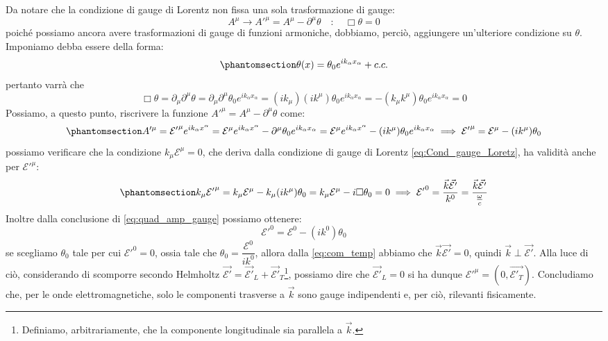 Da notare che la condizione di gauge di Lorentz non fissa una sola trasformazione di gauge:
\begin{equation*}
    A^\mu \rightarrow A'^\mu=A^\mu-\partial^\mu \theta \quad:\quad \Box \theta=0
\end{equation*}
poiché possiamo ancora avere trasformazioni di gauge di funzioni armoniche, dobbiamo, perciò, aggiungere un'ulteriore condizione su $\theta$. Imponiamo debba essere della forma:
\begin{equation}\phantomsection\label{eq:teta_piana}
    \theta(x)=\theta_0 e^{ik_\alpha x_\alpha}+c.c.
\end{equation}
pertanto varrà che 
\begin{equation*}
    \Box \theta=\partial_\mu\partial^\mu \theta=\partial_\mu\partial^\mu \theta_0 e^{ik_\alpha x_\alpha}=(ik_\mu)(ik^\mu)\theta_0 e^{ik_\alpha x_\alpha}=-(k_\mu k^\mu)\theta_0 e^{ik_\alpha x_\alpha}=0
\end{equation*}
Possiamo, a questo punto, riscrivere la funzione $A'^\mu=A^\mu-\partial^\mu\theta$ come:
\begin{equation}\phantomsection\label{eq:quad_amp_gauge}
    A'^\mu=\mathcal{E'}^\mu e^{ik_\alpha x^\alpha}=\mathcal{E}^\mu e^{ik_\alpha x^\alpha}-\partial^\mu \theta_0 e^{ik_\alpha x_\alpha}=\mathcal{E}^\mu e^{ik_\alpha x^\alpha}-(ik^\mu) \theta_0 e^{ik_\alpha x_\alpha}\implies\mathcal{E'}^\mu=\mathcal{E}^\mu -(ik^\mu) \theta_0 
\end{equation}
possiamo verificare che la condizione $k_\mu\mathcal{E}^\mu=0$, che deriva dalla condizione di gauge di Lorentz \eqref{eq:Cond_gauge_Loretz}, ha validità anche per $\mathcal{E'}^\mu$:
\begin{equation}\phantomsection\label{eq:com_temp}
       k_\mu\mathcal{E'}^\mu= k_\mu\mathcal{E}^\mu-k_\mu(ik^\mu) \theta_0 =k_\mu\mathcal{E}^\mu-i\Box \theta_0 =0 \implies\mathcal{E'}^0=\dfrac{\Vec{k}\Vec{\mathcal{E'}}}{k^0}=\dfrac{\Vec{k}\Vec{\mathcal{E'}}}{\frac{\omega}{c  }}
\end{equation}
Inoltre dalla conclusione di \eqref{eq:quad_amp_gauge} possiamo ottenere:
\begin{equation}
  \mathcal{E'}^0=\mathcal{E}^0 -(ik^0) \theta_0 
\end{equation}
se scegliamo $ \theta_0 $ tale per cui $\mathcal{E'}^0=0$, ossia tale che $\theta_0=\dfrac{\mathcal{E}^0}{ik^0}$, allora dalla \eqref{eq:com_temp} abbiamo che $\Vec{k}\Vec{\mathcal{E'}}=0$, quindi $\Vec{k}\perp\Vec{\mathcal{E'}}$. Alla luce di ciò, considerando di scomporre secondo Helmholtz $\Vec{\mathcal{E'}}=\Vec{\mathcal{E'}}_L+\Vec{\mathcal{E'}}_T$\footnote{Definiamo, arbitrariamente, che la componente longitudinale sia parallela a $\Vec{k}$.}, possiamo dire che $\Vec{\mathcal{E'}}_L=0$ si ha dunque $\mathcal{E'}^\mu=(0,\Vec{\mathcal{E'}_T})$. Concludiamo che, per le onde elettromagnetiche, solo le componenti trasverse a $\Vec{k}$ sono gauge indipendenti e, per ciò, rilevanti fisicamente.

